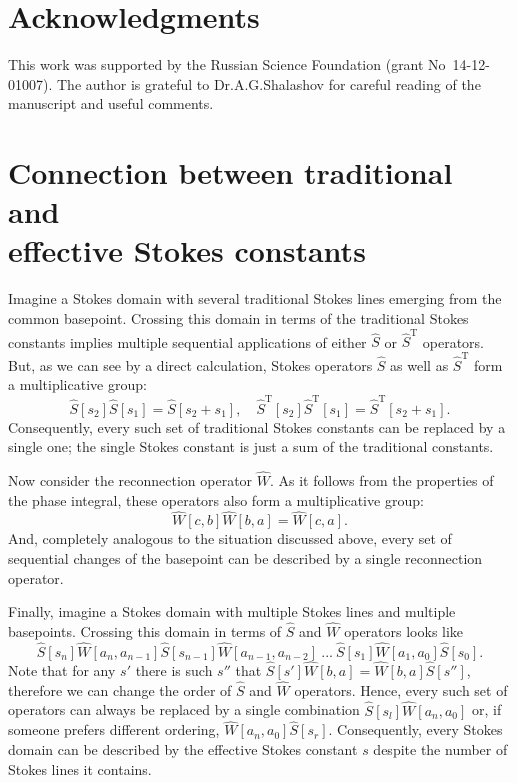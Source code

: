 \documentclass[atmp]{ipart_v1}
\def\S{\widehat{S}}
\def\W{\widehat{W}}
\def\T{\mathrm{T}}
\begin{document}
\section*{Acknowledgments}
This work was supported by the Russian Science Foundation (grant No~14-12-01007). The author is grateful to
Dr.A.G.Shalashov for careful reading of the manuscript and useful comments.
















\appendix

\section{Connection between traditional and \\ effective Stokes constants \label{app1}}

Imagine a Stokes domain with several traditional Stokes lines 
emerging from the common basepoint. Crossing this domain in terms of the traditional Stokes constants
implies multiple sequential applications of either $\S$ or $\S^{\T}$ operators. 
But, as we can see by a direct calculation, Stokes operators $\S$ as well as $\S^{\T}$ 
form a multiplicative group:
\begin{equation}
\S[s_2]\S[s_1] = \S[s_2 + s_1], \quad
\S^{\T}[s_2]\S^{\T}[s_1] = \S^{\T}[s_2 + s_1].
\end{equation}
Consequently, every such set of traditional Stokes constants can be replaced by a single one;
the single Stokes constant is just a sum of the traditional constants.

Now consider the reconnection operator $\W$. As it follows from the properties of the phase integral, 
these operators also form a multiplicative group:
\begin{equation}
\W[c,b]\W[b,a] = \W[c,a].
\end{equation}
And, completely analogous to the situation discussed above, every set of sequential changes of the basepoint
can be described by a single reconnection operator.

Finally, imagine a Stokes domain with multiple Stokes lines and multiple basepoints. Crossing this 
domain in terms of $\S$ and $\W$ operators looks like
\begin{equation}
\S[s_n]\W[a_n,a_{n-1}]\S[s_{n-1}]\W[a_{n-1},a_{n-2}]\ ...\ \S[s_1]\W[a_1,a_0]\S[s_0].
\end{equation}
Note that for any $s'$ there is such $s''$ that $\S[s']\W[b,a]=\W[b,a]\S[s'']$, therefore
we can change the order of $\S$ and $\W$ operators. Hence,
every such set of operators can always be replaced by a single combination $\S[s_l] \W[a_n,a_0]$ or, 
if someone prefers different ordering, $\W[a_n,a_0] \S[s_r]$. Consequently, every Stokes domain can 
be described by the effective Stokes constant $s$ despite the number of Stokes lines it contains.
\end{document}
